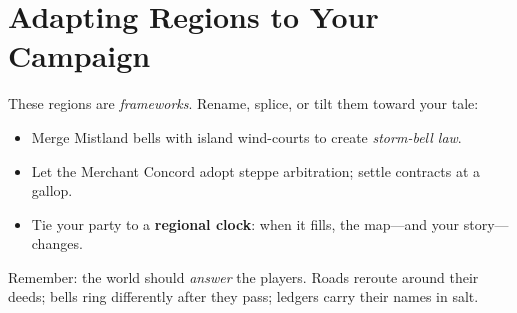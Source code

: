 \section{Adapting Regions to Your Campaign}

These regions are \emph{frameworks}. Rename, splice, or tilt them toward your tale:
\begin{itemize}
\item Merge Mistland bells with island wind-courts to create \emph{storm-bell law}.
\item Let the Merchant Concord adopt steppe arbitration; settle contracts at a gallop.
\item Tie your party to a \textbf{regional clock}: when it fills, the map---and your story---changes.
\end{itemize}

Remember: the world should \emph{answer} the players. Roads reroute around their deeds; bells ring differently after they pass; ledgers carry their names in salt.